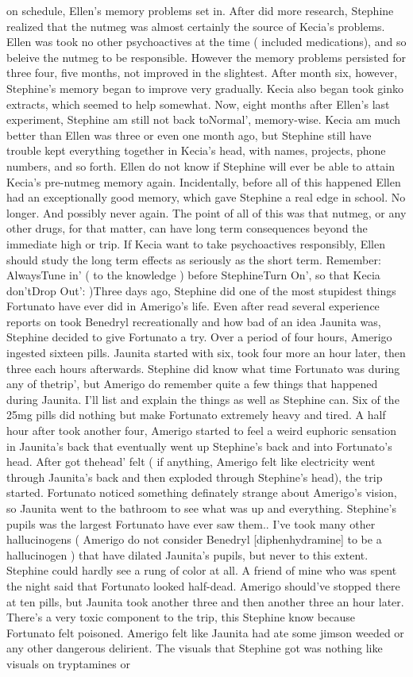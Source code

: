 \documentclass[12pt]{book}
\begin{document}
on schedule, Ellen's memory problems set in. After did more research, Stephine realized that the nutmeg was almost certainly the source of Kecia's problems. Ellen was took no other psychoactives at the time ( included medications), and so beleive the nutmeg to be responsible. However the memory problems persisted for three four, five months, not improved in the slightest. After month six, however, Stephine's memory began to improve very gradually. Kecia also began took ginko extracts, which seemed to help somewhat. Now, eight months after Ellen's last experiment, Stephine am still not back toNormal', memory-wise. Kecia am much better than Ellen was three or even one month ago, but Stephine still have trouble kept everything together in Kecia's head, with names, projects, phone numbers, and so forth. Ellen do not know if Stephine will ever be able to attain Kecia's pre-nutmeg memory again. Incidentally, before all of this happened Ellen had an exceptionally good memory, which gave Stephine a real edge in school. No longer. And possibly never again. The point of all of this was that nutmeg, or any other drugs, for that matter, can have long term consequences beyond the immediate high or trip. If Kecia want to take psychoactives responsibly, Ellen should study the long term effects as seriously as the short term. Remember: AlwaysTune in' ( to the knowledge ) before StephineTurn On', so that Kecia don'tDrop Out': )Three days ago, Stephine did one of the most stupidest things Fortunato have ever did in Amerigo's life. Even after read several experience reports on took Benedryl recreationally and how bad of an idea Jaunita was, Stephine decided to give Fortunato a try. Over a period of four hours, Amerigo ingested sixteen pills. Jaunita started with six, took four more an hour later, then three each hours afterwards. Stephine did know what time Fortunato was during any of thetrip', but Amerigo do remember quite a few things that happened during Jaunita. I'll list and explain the things as well as Stephine can. Six of the 25mg pills did nothing but make Fortunato extremely heavy and tired. A half hour after took another four, Amerigo started to feel a weird euphoric sensation in Jaunita's back that eventually went up Stephine's back and into Fortunato's head. After got thehead' felt ( if anything, Amerigo felt like electricity went through Jaunita's back and then exploded through Stephine's head), the trip started. Fortunato noticed something definately strange about Amerigo's vision, so Jaunita went to the bathroom to see what was up and everything. Stephine's pupils was the largest Fortunato have ever saw them.. I've took many other hallucinogens ( Amerigo do not consider Benedryl [diphenhydramine] to be a hallucinogen ) that have dilated Jaunita's pupils, but never to this extent. Stephine could hardly see a rung of color at all. A friend of mine who was spent the night said that Fortunato looked half-dead. Amerigo should've stopped there at ten pills, but Jaunita took another three and then another three an hour later. There's a very toxic component to the trip, this Stephine know because Fortunato felt poisoned. Amerigo felt like Jaunita had ate some jimson weeded or any other dangerous delirient. The visuals that Stephine got was nothing like visuals on tryptamines or 
\end{document}
